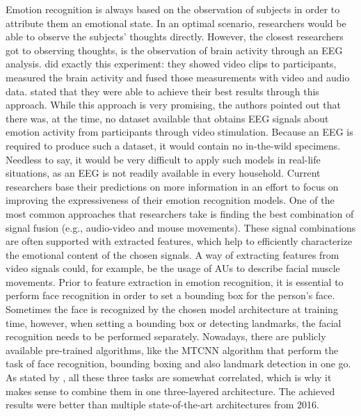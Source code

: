 Emotion recognition is always based on the observation of subjects in order to attribute them an emotional state. In an optimal scenario, researchers would be able to observe the subjects' thoughts directly. However, the closest researchers got to observing thoughts, is the observation of brain activity through an EEG analysis. \citet{Xing:2019:EEGAudioVisual} did exactly this experiment: they showed video clips to participants, measured the brain activity and fused those measurements with video and audio data. \citet{Xing:2019:EEGAudioVisual} stated that they were able to achieve their best results through this approach.
\newline
While this approach is very promising, the authors pointed out that there was, at the time, no dataset available that obtains EEG signals about emotion activity from participants through video stimulation. Because an EEG is required to produce such a dataset, it would contain no in-the-wild specimens. Needless to say, it would be very difficult to apply such models in real-life situations, as an EEG is not readily available in every household.
\newline\newline
Current researchers base their predictions on more information in an effort to focus on improving the expressiveness of their emotion recognition models. One of the most common approaches that researchers take is finding the best combination of signal fusion (e.g., audio-video and mouse movements). These signal combinations are often supported with extracted features, which help to efficiently characterize the emotional content of the chosen signals. A way of extracting features from video signals could, for example, be the usage of AUs to describe facial muscle movements. 
\newline\newline
Prior to feature extraction in emotion recognition, it is essential to perform face recognition in order to set a bounding box for the person's face. Sometimes the face is recognized by the chosen model architecture at training time, however, when setting a bounding box or detecting landmarks, the facial recognition needs to be performed separately. Nowadays, there are publicly available pre-trained algorithms, like the MTCNN algorithm \citep{Zhang:2016:MTCCN} that perform the task of face recognition, bounding boxing and also landmark detection in one go. As stated by \citet{Zhang:2016:MTCCN}, all these three tasks are somewhat correlated, which is why it makes sense to combine them in one three-layered architecture. The achieved results were better than multiple state-of-the-art architectures from 2016.
